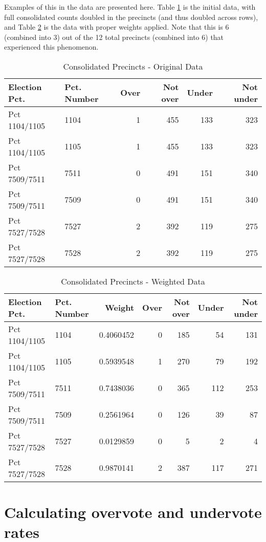 \documentclass[12pt,twoside]{reedthesis}
\begin{document}
Examples of this in the data are presented here. Table \ref{tab:double-initial} is the initial data, with full consolidated counts doubled in the precincts (and thus doubled across rows), and Table \ref{tab:double-combined} is the data with proper weights applied. Note that this is 6 (combined into 3) out of the 12 total precincts (combined into 6) that experienced this phenomenon.
\begin{table}[t]

\caption[Consolidated Precincts - Original]{\label{tab:double-initial}Consolidated Precincts - Original Data}
\centering
\begin{tabular}{llrrrr}
\toprule
Election Pct. & Pct. Number & Over & Not over & Under & Not under\\
\midrule
Pct 1104/1105 & 1104 & 1 & 455 & 133 & 323\\
Pct 1104/1105 & 1105 & 1 & 455 & 133 & 323\\
Pct 7509/7511 & 7511 & 0 & 491 & 151 & 340\\
Pct 7509/7511 & 7509 & 0 & 491 & 151 & 340\\
Pct 7527/7528 & 7527 & 2 & 392 & 119 & 275\\
\addlinespace
Pct 7527/7528 & 7528 & 2 & 392 & 119 & 275\\
\bottomrule
\end{tabular}
\end{table}
\begin{table}[t]

\caption[Consolidated Precincts - Weighted]{\label{tab:double-combined}Consolidated Precincts - Weighted Data}
\centering
\begin{tabular}{llrrrrr}
\toprule
Election Pct. & Pct. Number & Weight & Over & Not over & Under & Not under\\
\midrule
Pct 1104/1105 & 1104 & 0.4060452 & 0 & 185 & 54 & 131\\
Pct 1104/1105 & 1105 & 0.5939548 & 1 & 270 & 79 & 192\\
Pct 7509/7511 & 7511 & 0.7438036 & 0 & 365 & 112 & 253\\
Pct 7509/7511 & 7509 & 0.2561964 & 0 & 126 & 39 & 87\\
Pct 7527/7528 & 7527 & 0.0129859 & 0 & 5 & 2 & 4\\
\addlinespace
Pct 7527/7528 & 7528 & 0.9870141 & 2 & 387 & 117 & 271\\
\bottomrule
\end{tabular}
\end{table}
\hypertarget{calculating-overvote-and-undervote-rates}{%
\section{Calculating overvote and undervote rates}\label{calculating-overvote-and-undervote-rates}}
\end{document}
